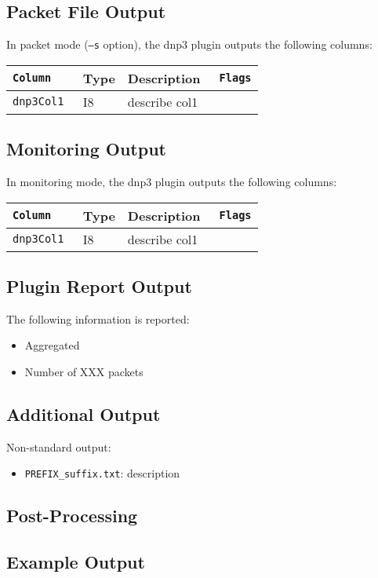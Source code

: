 \documentclass[documentation]{subfiles}
\begin{document}
\subsection{Packet File Output}
In packet mode ({\tt --s} option), the dnp3 plugin outputs the following columns:
\begin{longtable}{>{\tt}lll>{\tt\small}l}
    \toprule
    {\bf Column} & {\bf Type} & {\bf Description} & {\bf Flags}\\
    \midrule\endhead%
    dnp3Col1 & I8 & describe col1 & \\
    \bottomrule
\end{longtable}

\subsection{Monitoring Output}
In monitoring mode, the dnp3 plugin outputs the following columns:
\begin{longtable}{>{\tt}lll>{\tt\small}l}
    \toprule
    {\bf Column} & {\bf Type} & {\bf Description} & {\bf Flags}\\
    \midrule\endhead%
    dnp3Col1 & I8 & describe col1 & \\
    \bottomrule
\end{longtable}

\subsection{Plugin Report Output}
The following information is reported:
\begin{itemize}
    \item Aggregated {\tt{}}
    \item Number of XXX packets
\end{itemize}

\subsection{Additional Output}
Non-standard output:
\begin{itemize}
    \item {\tt PREFIX\_suffix.txt}: description
\end{itemize}

\subsection{Post-Processing}

\subsection{Example Output}
\end{document}
